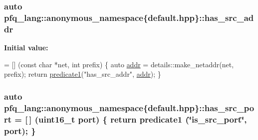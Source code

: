 \hypertarget{namespacepfq__lang_1_1anonymous__namespace_02default_8hpp_03_aabc75799de679df702f4179ead82114c}{
\subsubsection[{has\+\_\+src\+\_\+addr}]{\setlength{\rightskip}{0pt plus 5cm}auto pfq\+\_\+lang\+::anonymous\+\_\+namespace\{default.\+hpp\}\+::has\+\_\+src\+\_\+addr}}\label{namespacepfq__lang_1_1anonymous__namespace_02default_8hpp_03_aabc75799de679df702f4179ead82114c}
{\bfseries Initial value\+:}
\begin{DoxyCode}
= [] (\textcolor{keyword}{const} \textcolor{keywordtype}{char} *net, \textcolor{keywordtype}{int} prefix)
        \{
            \textcolor{keyword}{auto} \hyperlink{namespacepfq__lang_1_1anonymous__namespace_02default_8hpp_03_aafce8334d1be83bff9a2115439c8c453}{addr} = details::make\_netaddr(net, prefix);
            \textcolor{keywordflow}{return} \hyperlink{namespacepfq__lang_ae23a03cee94b5ddfde4a8d2e5c521f0e}{predicate1}(\textcolor{stringliteral}{"has\_src\_addr"}, \hyperlink{namespacepfq__lang_1_1anonymous__namespace_02default_8hpp_03_aafce8334d1be83bff9a2115439c8c453}{addr});
        \}
\end{DoxyCode}
\hypertarget{namespacepfq__lang_1_1anonymous__namespace_02default_8hpp_03_ad6d8ed8e08a448b3bf5d23a929d887f9}{
\subsubsection[{has\+\_\+src\+\_\+port}]{\setlength{\rightskip}{0pt plus 5cm}auto pfq\+\_\+lang\+::anonymous\+\_\+namespace\{default.\+hpp\}\+::has\+\_\+src\+\_\+port = \mbox{[}$\,$\mbox{]} (uint16\+\_\+t {\bf port}) \{ return {\bf predicate1} (\char`\"{}is\+\_\+src\+\_\+port\char`\"{}, port); \}}}\label{namespacepfq__lang_1_1anonymous__namespace_02default_8hpp_03_ad6d8ed8e08a448b3bf5d23a929d887f9}
